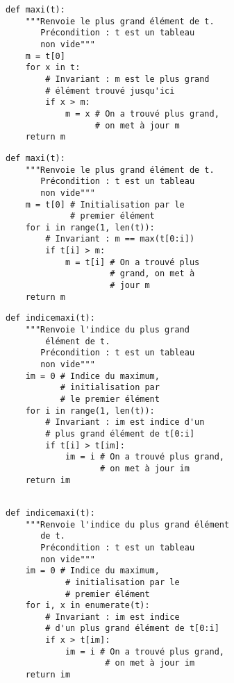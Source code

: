 \begin{lstlisting}
def maxi(t):
    """Renvoie le plus grand élément de t.
       Précondition : t est un tableau 
       non vide"""
    m = t[0]
    for x in t:
        # Invariant : m est le plus grand 
        # élément trouvé jusqu'ici
        if x > m:
            m = x # On a trouvé plus grand, 
                  # on met à jour m
    return m
\end{lstlisting}


\begin{lstlisting}
def maxi(t):
    """Renvoie le plus grand élément de t.
       Précondition : t est un tableau 
       non vide"""
    m = t[0] # Initialisation par le 
             # premier élément
    for i in range(1, len(t)):
        # Invariant : m == max(t[0:i])
        if t[i] > m:
            m = t[i] # On a trouvé plus
                     # grand, on met à 
                     # jour m
    return m
\end{lstlisting}


\begin{lstlisting}
def indicemaxi(t):
    """Renvoie l'indice du plus grand 
        élément de t.
       Précondition : t est un tableau 
       non vide"""
    im = 0 # Indice du maximum, 
           # initialisation par 
           # le premier élément
    for i in range(1, len(t)):
        # Invariant : im est indice d'un 
        # plus grand élément de t[0:i]
        if t[i] > t[im]:
            im = i # On a trouvé plus grand, 
                   # on met à jour im
    return im
    
\end{lstlisting}



\begin{lstlisting}
def indicemaxi(t):
    """Renvoie l'indice du plus grand élément 
       de t.
       Précondition : t est un tableau 
       non vide"""
    im = 0 # Indice du maximum, 
            # initialisation par le 
            # premier élément
    for i, x in enumerate(t):
        # Invariant : im est indice 
        # d'un plus grand élément de t[0:i]
        if x > t[im]:
            im = i # On a trouvé plus grand, 
                    # on met à jour im
    return im
\end{lstlisting}